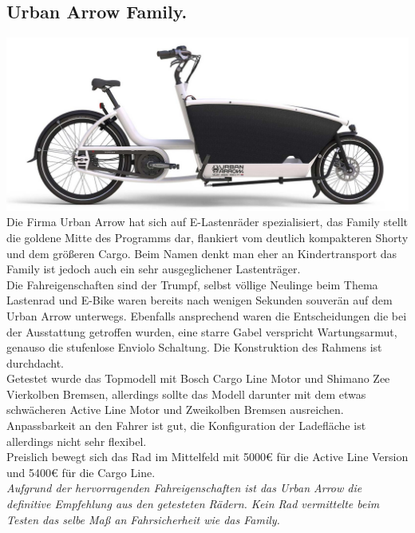 \documentclass[a4paper,ngerman, 14pt] {scrartcl}
\begin{document}
\subsection{Urban Arrow Family.}
\includegraphics[scale=0.325]{urban_arrow_family.png}\\
Die Firma Urban Arrow hat sich auf E-Lastenräder spezialisiert, das Family stellt die goldene Mitte des Programms dar, flankiert vom deutlich kompakteren Shorty und dem größeren Cargo. Beim Namen denkt man eher an Kindertransport das Family ist jedoch auch ein sehr ausgeglichener Lastenträger.\\
Die Fahreigenschaften sind der Trumpf, selbst völlige Neulinge beim Thema Lastenrad und E-Bike waren bereits nach wenigen Sekunden souverän auf dem Urban Arrow unterwegs. Ebenfalls ansprechend waren die Entscheidungen die bei der Ausstattung getroffen wurden, eine starre Gabel verspricht Wartungsarmut, genauso die stufenlose Enviolo Schaltung. Die Konstruktion des Rahmens ist durchdacht.\\
Getestet wurde das Topmodell mit Bosch Cargo Line Motor und Shimano Zee Vierkolben Bremsen, allerdings sollte das Modell darunter mit dem etwas schwächeren Active Line Motor und Zweikolben Bremsen ausreichen. Anpassbarkeit an den Fahrer ist gut, die Konfiguration der Ladefläche ist allerdings nicht sehr flexibel.\\
Preislich bewegt sich das Rad im Mittelfeld mit 5000€ für die Active Line Version und 5400€ für die Cargo Line.\\
\textit{Aufgrund der hervorragenden Fahreigenschaften ist das Urban Arrow die definitive Empfehlung aus den getesteten Rädern. Kein Rad vermittelte beim Testen das selbe Maß an Fahrsicherheit wie das Family.}
\end{document}
